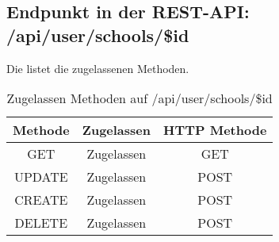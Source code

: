 \subsection{Endpunkt in der REST-API: /api/user/schools/\$id}
Die  listet die zugelassenen Methoden. 

\begin{table}[!htbp]
	\begin{tabular}{|c|c|c|}
		\hline
			\textbf{Methode} & \textbf{Zugelassen} & \textbf{HTTP Methode} \\ \hline
			GET & Zugelassen & GET \\ \hline
			UPDATE & Zugelassen & POST \\ \hline 
			CREATE & Zugelassen & POST \\ \hline 
			DELETE & Zugelassen & POST \\ \hline
	\end{tabular}

		\caption{Zugelassen Methoden auf /api/user/schools/\$id}
		\label{tab:end:rest:api:user:schools:id:meth}
\end{table}